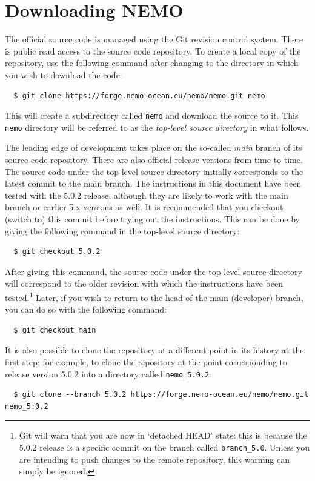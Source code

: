 \section{Downloading NEMO}
\label{sec:download}

The official \NEMOSIcu{} source code is managed using the Git revision control system.
There is public read access to the source code repository.
To create a local copy of the repository, use the following command after changing to the directory in which you wish to download the code:

\begin{verbatim}
  $ git clone https://forge.nemo-ocean.eu/nemo/nemo.git nemo
\end{verbatim}

This will create a subdirectory called \verb|nemo| and download the \NEMOSIcu{} source to it.
This \verb|nemo| directory will be referred to as the \textit{top-level source directory} in what follows.

The leading edge of \NEMOSIcu{} development takes place on the so-called \textit{main} branch of its source code repository.
There are also official release versions from time to time.
The source code under the top-level source directory initially corresponds to the latest commit to the main branch.
The instructions in this document have been tested with the 5.0.2 release, although they are likely to work with the main branch or earlier 5.x versions as well.
It is recommended that you checkout (switch to) this commit before trying out the instructions.
This can be done by giving the following command in the top-level source directory:

\begin{verbatim}
  $ git checkout 5.0.2
\end{verbatim}

After giving this command, the source code under the top-level source directory will correspond to the older revision with which the instructions have been tested.\footnote{
    Git will warn that you are now in `detached HEAD' state: this is because the 5.0.2 release is a specific commit on the branch called \texttt{branch\_5.0}.
    Unless you are intending to push changes to the remote repository, this warning can simply be ignored.
}
Later, if you wish to return to the head of the main (developer) branch, you can do so with the following command:

\begin{verbatim}
  $ git checkout main
\end{verbatim}

It is also possible to clone the repository at a different point in its history at the first step; for example, to clone the repository at the point corresponding to release version 5.0.2 into a directory called \verb|nemo_5.0.2|:

\begin{verbatim}
  $ git clone --branch 5.0.2 https://forge.nemo-ocean.eu/nemo/nemo.git nemo_5.0.2
\end{verbatim}
